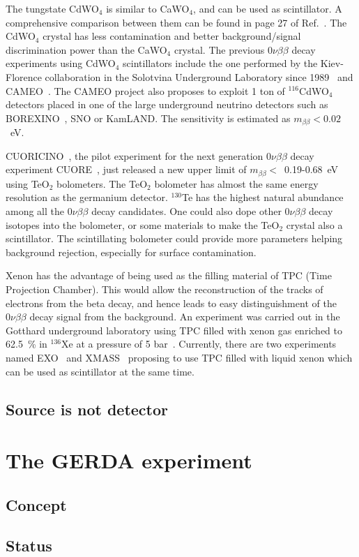 The tungstate CdWO$_{4}$ is similar to CaWO$_{4}$, and can be used as scintillator. A comprehensive comparison between them can be found in page 27 of Ref.~\cite{Avi05}. The CdWO$_{4}$ crystal has less contamination and better background/signal discrimination power than the CaWO$_{4}$ crystal. The previous $0\nu\beta\beta$ decay experiments using CdWO$_{4}$ scintillators include the one performed by the Kiev-Florence collaboration in the Solotvina Underground Laboratory since 1989~\cite{Dan00, Dan03} and CAMEO~\cite{Bel00, Bel01}. The CAMEO project also proposes to exploit 1 ton of $^{116}$CdWO$_{4}$ detectors placed in one of the large underground neutrino detectors such as BOREXINO~\cite{Arp08}, SNO or KamLAND. The sensitivity is estimated as $m_{\beta\beta} < 0.02$~eV.

CUORICINO~\cite{Pre04}, the pilot experiment for the next generation $0\nu\beta\beta$ decay experiment CUORE~\cite{Arn04, Ard05}, just released a new upper limit of $m_{\beta\beta} <$~0.19-0.68~eV~\cite{Arn08} using TeO$_{2}$ bolometers. The TeO$_{2}$ bolometer has almost the same energy resolution as the germanium detector. $^{130}$Te has the highest natural abundance among all the $0\nu\beta\beta$ decay candidates. One could also dope other $0\nu\beta\beta$ decay isotopes into the bolometer, or some materials to make the TeO$_{2}$ crystal also a scintillator. The scintillating bolometer could provide more parameters helping background rejection, especially for surface contamination.

Xenon has the advantage of being used as the filling material of TPC (Time Projection Chamber). This would allow the reconstruction of the tracks of electrons from the beta decay, and hence leads to easy distinguishment of the $0\nu\beta\beta$ decay signal from the background. An experiment was carried out in the Gotthard underground laboratory using TPC filled with xenon gas enriched to 62.5~\% in $^{136}$Xe at a pressure of 5 bar~\cite{Lue98}. Currently, there are two experiments named EXO~\cite{Aki05} and XMASS~\cite{Kim05} proposing to use TPC filled with liquid xenon which can be used as scintillator at the same time.

\subsection{Source is not  detector}
\label{sec:gerda:sued}

\section{The GERDA experiment}
\label{sec:gerda:concept}

\subsection{Concept}
\label{sec:gerda:concept}

\subsection{Status}
\label{sec:gerda:status}


